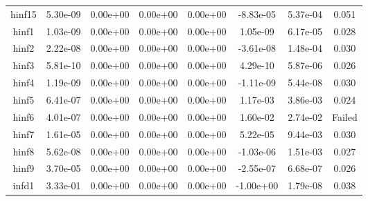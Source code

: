 {{\begin{table}[h]
\begin{center}
{\begin{tabular}{cccccccc}
              hinf15 & 5.30e-09 & 0.00e+00 & 0.00e+00 & 0.00e+00 & -8.83e-05 & 5.37e-04 & 0.051 \\ 
               hinf1 & 1.03e-09 & 0.00e+00 & 0.00e+00 & 0.00e+00 & 1.05e-09 & 6.17e-05 & 0.028 \\ 
               hinf2 & 2.22e-08 & 0.00e+00 & 0.00e+00 & 0.00e+00 & -3.61e-08 & 1.48e-04 & 0.030 \\ 
               hinf3 & 5.81e-10 & 0.00e+00 & 0.00e+00 & 0.00e+00 & 4.29e-10 & 5.87e-06 & 0.026 \\ 
               hinf4 & 1.19e-09 & 0.00e+00 & 0.00e+00 & 0.00e+00 & -1.11e-09 & 5.44e-08 & 0.030 \\ 
               hinf5 & 6.41e-07 & 0.00e+00 & 0.00e+00 & 0.00e+00 & 1.17e-03 & 3.86e-03 & 0.024 \\ 
               hinf6 & 4.01e-07 & 0.00e+00 & 0.00e+00 & 0.00e+00 & 1.60e-02 & 2.74e-02 & Failed \\ 
               hinf7 & 1.61e-05 & 0.00e+00 & 0.00e+00 & 0.00e+00 & 5.22e-05 & 9.44e-03 & 0.030 \\ 
               hinf8 & 5.62e-08 & 0.00e+00 & 0.00e+00 & 0.00e+00 & -1.03e-06 & 1.51e-03 & 0.027 \\ 
               hinf9 & 3.70e-05 & 0.00e+00 & 0.00e+00 & 0.00e+00 & -2.55e-07 & 6.68e-07 & 0.026 \\ 
               infd1 & 3.33e-01 & 0.00e+00 & 0.00e+00 & 0.00e+00 & -1.00e+00 & 1.79e-08 & 0.038\\
      \bottomrule
    \end{tabular}
  }  
\end{center}
\end{table}}}

